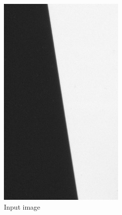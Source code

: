 \documentclass[a4paper]{article}
\begin{document}
\begin{figure}[!ht]
\centering
\begin{subfigure}[c]{0.15\textwidth}
    \includegraphics[width=\textwidth]{figures/single_roi_input}
    \caption{Input image}
\end{subfigure}
\qquad
\begin{subfigure}[c]{0.15\textwidth}

\end{subfigure}
\end{figure}
\end{document}
